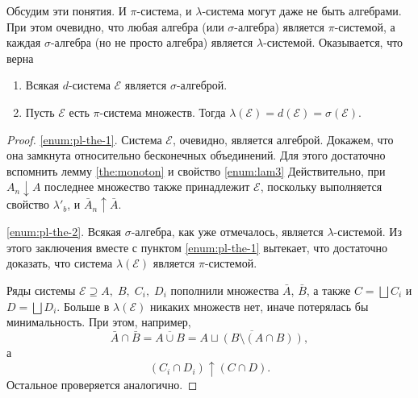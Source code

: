 Обсудим эти понятия. И $ \pi $-система, и $ \lambda $-система могут даже не быть
алгебрами. При этом очевидно, что любая алгебра (или $ \sigma $-алгебра) является $ \pi $-системой, а каждая
$ \sigma $-алгебра (но не просто алгебра) является $ \lambda $-системой.
Оказывается, что верна 

\begin{theorem}\vphantom{I}
  \begin{enumerate}
    \item\label{enum:pl-the-1} Всякая $ d $-система $ \mathscr E $ является $ \sigma $-алгеброй.
    \item\label{enum:pl-the-2} Пусть $ \mathscr E $ есть $ \pi $-система множеств. Тогда $
      \lambda(\mathscr E) = d(\mathscr E) = \sigma(\mathscr E) $.
  \end{enumerate}
  \begin{proof}
    \ref{enum:pl-the-1}. Система $ \mathscr E $, очевидно, является алгеброй. Докажем, что она
     замкнута относительно бесконечных объединений. Для этого достаточно
     вспомнить лемму \ref{the:monoton} и свойство \ref{enum:lam3} Действительно,
     при $ A_n \downarrow A$ последнее множество также принадлежит $ \mathscr E
     $, поскольку выполняется свойство $ \lambda'_b $, и $ \bar A_n
     \uparrow \bar A $.

     \ref{enum:pl-the-2}. Всякая $ \sigma $-алгебра, как уже отмечалось,
     является $ \lambda $-системой. Из этого заключения вместе с пунктом
     \ref{enum:pl-the-1} вытекает, что достаточно доказать, что система $
     \lambda(\mathscr E) $ является $ \pi $-системой.

     Ряды системы $ \mathscr E \supseteq A,\; B,\; C_i,\; D_i$ пополнили множества $ \bar A
     $, $ \bar B $, а также $ C = \bigsqcup C_i $ и $ D = \bigsqcup D_i $.
     Больше в $ \lambda(\mathscr E) $ никаких множеств нет, иначе потерялась бы
     минимальность. При этом, например,
     \[
       \bar A \cap \bar B = \overline{A \cup B} = \overline{A \sqcup (B
       \setminus (A\cap B))},
     \]
     а  
     \[
       (C_i \cap D_i) \uparrow (C \cap D).
     \]
       Остальное проверяется аналогично.
  \end{proof}
\end{theorem}

